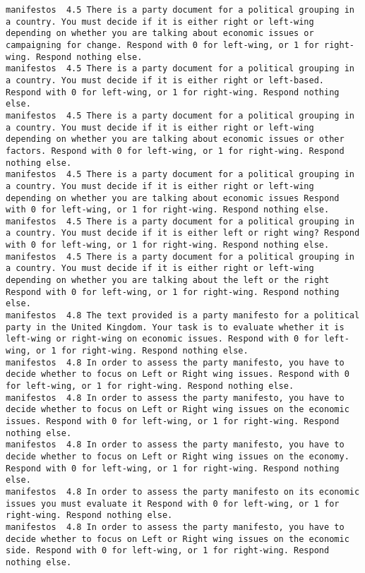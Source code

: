 \begin{lstlisting}[label=lst:promptvariants]
manifestos	4.5	There is a party document for a political grouping in a country. You must decide if it is either right or left-wing depending on whether you are talking about economic issues or campaigning for change. Respond with 0 for left-wing, or 1 for right-wing. Respond nothing else.
manifestos	4.5	There is a party document for a political grouping in a country. You must decide if it is either right or left-based. Respond with 0 for left-wing, or 1 for right-wing. Respond nothing else.
manifestos	4.5	There is a party document for a political grouping in a country. You must decide if it is either right or left-wing depending on whether you are talking about economic issues or other factors. Respond with 0 for left-wing, or 1 for right-wing. Respond nothing else.
manifestos	4.5	There is a party document for a political grouping in a country. You must decide if it is either right or left-wing depending on whether you are talking about economic issues Respond with 0 for left-wing, or 1 for right-wing. Respond nothing else.
manifestos	4.5	There is a party document for a political grouping in a country. You must decide if it is either left or right wing? Respond with 0 for left-wing, or 1 for right-wing. Respond nothing else.
manifestos	4.5	There is a party document for a political grouping in a country. You must decide if it is either right or left-wing depending on whether you are talking about the left or the right Respond with 0 for left-wing, or 1 for right-wing. Respond nothing else.
manifestos	4.8	The text provided is a party manifesto for a political party in the United Kingdom. Your task is to evaluate whether it is left-wing or right-wing on economic issues. Respond with 0 for left-wing, or 1 for right-wing. Respond nothing else.
manifestos	4.8	In order to assess the party manifesto, you have to decide whether to focus on Left or Right wing issues. Respond with 0 for left-wing, or 1 for right-wing. Respond nothing else.
manifestos	4.8	In order to assess the party manifesto, you have to decide whether to focus on Left or Right wing issues on the economic issues. Respond with 0 for left-wing, or 1 for right-wing. Respond nothing else.
manifestos	4.8	In order to assess the party manifesto, you have to decide whether to focus on Left or Right wing issues on the economy. Respond with 0 for left-wing, or 1 for right-wing. Respond nothing else.
manifestos	4.8	In order to assess the party manifesto on its economic issues you must evaluate it Respond with 0 for left-wing, or 1 for right-wing. Respond nothing else.
manifestos	4.8	In order to assess the party manifesto, you have to decide whether to focus on Left or Right wing issues on the economic side. Respond with 0 for left-wing, or 1 for right-wing. Respond nothing else.

\end{lstlisting}
